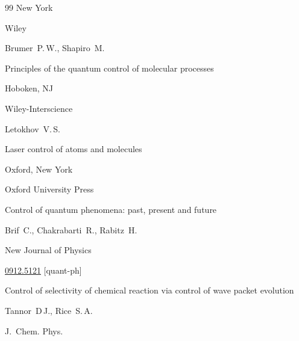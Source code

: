 \begin{thebibliography}{99}
\publaddr New York

\publ Wiley






\by Brumer~P.\,W., Shapiro~M.

\book Principles of the quantum control of molecular processes

\publaddr Hoboken, NJ

\publ Wiley-Interscience






\by Letokhov~V.\,S.

\book Laser control of atoms and molecules

\publaddr Oxford, New York

\publ Oxford University Press






\paper Control of quantum phenomena: past, present and futu\-re

\by Brif~C., Chakrabarti~R., Rabitz~H.

\jour New Journal of Physics






\arxiv \href{http://arxiv.org/abs/0912.5121}{0912.5121} \mbox{[quant-ph]}




\paper Control of selectivity of chemical reaction via control of wave packet evolution

\by Tannor~D\,J., Rice~S.\,A.

\jour J.~Chem. Phys.













\end{thebibliography}
